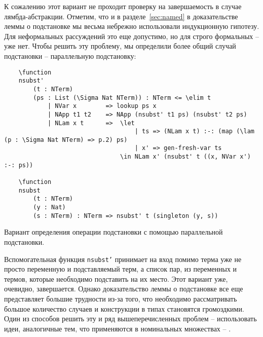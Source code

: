 К сожалению этот вариант не проходит проверку на завершаемость в случае лямбда-абстракции. Отметим, что и в разделе~\ref{sec:named} в доказательстве леммы о подстановке мы весьма небрежно использовали индукционную гипотезу. Для неформальных рассуждений это еще допустимо, но для строго формальных -- уже нет. Чтобы решить эту проблему, мы определили более общий случай подстановки -- параллельную подстановку:

\begin{listing}[H]
  \begin{verbatim}
    \function
    nsubst'
        (t : NTerm)
        (ps : List (\Sigma Nat NTerm)) : NTerm <= \elim t
            | NVar x        => lookup ps x
            | NApp t1 t2    => NApp (nsubst' t1 ps) (nsubst' t2 ps)
            | NLam x t      =>  \let
                                    | ts => (NLam x t) :-: (map (\lam (p : \Sigma Nat NTerm) => p.2) ps)
                                    | x' => gen-fresh-var ts
                                \in NLam x' (nsubst' t ((x, NVar x') :-: ps))

    \function
    nsubst
        (t : NTerm)
        (y : Nat)
        (s : NTerm) : NTerm => nsubst' t (singleton (y, s))
  \end{verbatim}
  \caption{Вариант определения операции подстановки с помощью параллельной подстановки.}
\end{listing}

Вспомогательная функция \texttt{nsubst'} принимает на вход помимо терма уже не просто переменную и подставляемый терм, а список пар, из переменных и термов, которые необходимо подставить на их место. Этот вариант уже, очевидно, завершается. Однако доказательство леммы о подстановке все еще представляет большие трудности из-за того, что необходимо рассматривать большое количество случаев и конструкции в типах становятся громоздкими. Один из способов решить эту и ряд вышеперечисленных проблем -- использовать идеи, аналогичные тем, что применяются в номинальных множествах -- \cite{pitts2013nominal}.
